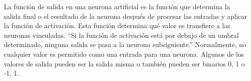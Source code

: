 La función de salida en una neurona artificial es la función que determina la salida final o el resultado de la neurona después de procesar las entradas y aplicar la función de activación. Esta función determina qué valor se transfiere a las neuronas vinculadas. ``Si la función de activación está por debajo de un umbral determinado, ninguna salida se pasa a la neurona subsiguiente.''\cite[p. 12]{matich2001redes} Normalmente, no cualquier valor es permitido como una entrada para una neurona. Algunos de los valores de salida pueden ser la salida misma o también pueden ser binarios {0, 1} o {-1, 1}.